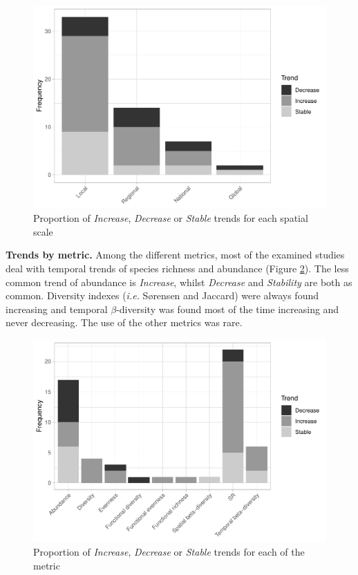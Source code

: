 \documentclass[
  12pt,
  oneside]{report}
\begin{document}
\begin{figure}
\centering
\includegraphics{literature_review_files/figure-latex/barspatscale-1.pdf}
\caption{\label{fig:barspatscale}Proportion of \emph{Increase}, \emph{Decrease} or \emph{Stable} trends for each spatial scale}
\end{figure}

\textbf{Trends by metric.} Among the different metrics, most of the examined studies deal with temporal trends of species richness and abundance (Figure \ref{fig:barmetrics}). The less common trend of abundance is \emph{Increase}, whilst \emph{Decrease} and \emph{Stability} are both as common. Diversity indexes (\emph{i.e.} Sørensen and Jaccard) were always found increasing and temporal \(\beta\)-diversity was found most of the time increasing and never decreasing. The use of the other metrics was rare.

\begin{figure}
\centering
\includegraphics{literature_review_files/figure-latex/barmetrics-1.pdf}
\caption{\label{fig:barmetrics}Proportion of \emph{Increase}, \emph{Decrease} or \emph{Stable} trends for each of the metric}
\end{figure}
\end{document}
